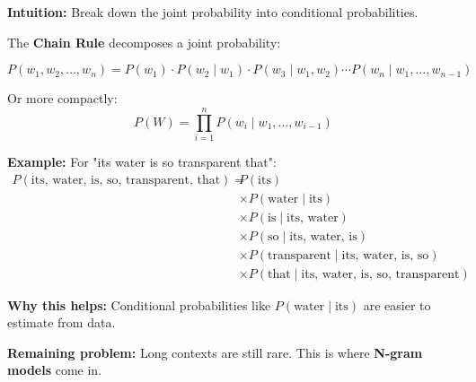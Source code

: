 \documentclass[11pt,a4paper]{article}
\theoremstyle{definition}
\theoremstyle{plain}
\theoremstyle{remark}
\begin{document}
\textbf{Intuition:} Break down the joint probability into conditional probabilities.

The \textbf{Chain Rule} decomposes a joint probability:

\[
P(w_1, w_2, \ldots, w_n) = P(w_1) \cdot P(w_2 \mid w_1) \cdot P(w_3 \mid w_1, w_2) \cdots P(w_n \mid w_1, \ldots, w_{n-1})
\]

Or more compactly:
\[
P(W) = \prod_{i=1}^{n} P(w_i \mid w_1, \ldots, w_{i-1})
\]

\textbf{Example:} For "its water is so transparent that":
\begin{align*}
P(\text{its, water, is, so, transparent, that}) = \; & P(\text{its}) \\
& \times P(\text{water} \mid \text{its}) \\
& \times P(\text{is} \mid \text{its, water}) \\
& \times P(\text{so} \mid \text{its, water, is}) \\
& \times P(\text{transparent} \mid \text{its, water, is, so}) \\
& \times P(\text{that} \mid \text{its, water, is, so, transparent})
\end{align*}

\textbf{Why this helps:} Conditional probabilities like $P(\text{water} \mid \text{its})$ are easier to estimate from data.

\textbf{Remaining problem:} Long contexts are still rare. This is where \textbf{N-gram models} come in.
\end{document}
